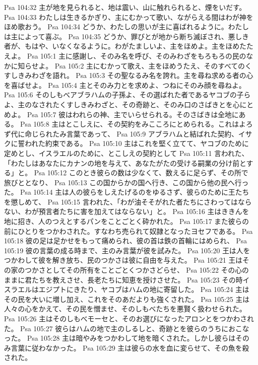 Psa 104:32  主が地を見られると、地は震い、山に触れられると、煙をいだす。
Psa 104:33  わたしは生きるかぎり、主にむかって歌い、ながらえる間はわが神をほめ歌おう。
Psa 104:34  どうか、わたしの思いが主に喜ばれるように。わたしは主によって喜ぶ。
Psa 104:35  どうか、罪びとが地から断ち滅ぼされ、悪しき者が、もはや、いなくなるように。わがたましいよ、主をほめよ。主をほめたたえよ。
Psa 105:1  主に感謝し、そのみ名を呼び、そのみわざをもろもろの民のなかに知らせよ。
Psa 105:2  主にむかって歌え、主をほめうたえ、そのすべてのくすしきみわざを語れ。
Psa 105:3  その聖なるみ名を誇れ。主を尋ね求める者の心を喜ばせよ。
Psa 105:4  主とそのみ力とを求めよ、つねにそのみ顔を尋ねよ。
Psa 105:6  そのしもべアブラハムの子孫よ、その選ばれた者であるヤコブの子らよ、主のなされたくすしきみわざと、その奇跡と、そのみ口のさばきとを心にとめよ。
Psa 105:7  彼はわれらの神、主でいらせられる。そのさばきは全地にある。
Psa 105:8  主はとこしえに、その契約をみこころにとめられる。これはよろず代に命じられたみ言葉であって、
Psa 105:9  アブラハムと結ばれた契約、イサクに誓われた約束である。
Psa 105:10  主はこれを堅く立てて、ヤコブのために定めとし、イスラエルのために、とこしえの契約として
Psa 105:11  言われた、「わたしはあなたにカナンの地を与えて、あなたがたの受ける嗣業の分け前とする」と。
Psa 105:12  このとき彼らの数は少なくて、数えるに足らず、その所で旅びととなり、
Psa 105:13  この国からかの国へ行き、この国から他の民へ行った。
Psa 105:14  主は人の彼らをしえたげるのをゆるさず、彼らのために王たちを懲しめて、
Psa 105:15  言われた、「わが油そそがれた者たちにさわってはならない、わが預言者たちに害を加えてはならない」と。
Psa 105:16  主はききんを地に招き、人のつえとするパンをことごとく砕かれた。
Psa 105:17  また彼らの前にひとりをつかわされた。すなわち売られて奴隷となったヨセフである。
Psa 105:18  彼の足は足かせをもって痛められ、彼の首は鉄の首輪にはめられ、
Psa 105:19  彼の言葉の成る時まで、主のみ言葉が彼を試みた。
Psa 105:20  王は人をつかわして彼を解き放ち、民のつかさは彼に自由を与えた。
Psa 105:21  王はその家のつかさとしてその所有をことごとくつかさどらせ、
Psa 105:22  その心のままに君たちを教えさせ、長老たちに知恵を授けさせた。
Psa 105:23  その時イスラエルはエジプトにきたり、ヤコブはハムの地に寄留した。
Psa 105:24  主はその民を大いに増し加え、これをそのあだよりも強くされた。
Psa 105:25  主は人々の心をかえて、その民を憎ませ、そのしもべたちを悪賢く扱わせられた。
Psa 105:26  主はそのしもべモーセと、そのお選びになったアロンとをつかわされた。
Psa 105:27  彼らはハムの地で主のしるしと、奇跡とを彼らのうちにおこなった。
Psa 105:28  主は暗やみをつかわして地を暗くされた。しかし彼らはそのみ言葉に従わなかった。
Psa 105:29  主は彼らの水を血に変らせて、その魚を殺された。
